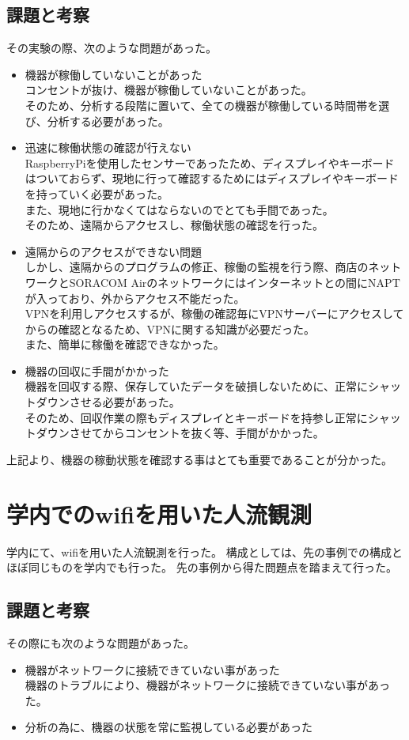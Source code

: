 \subsection{課題と考察}
その実験の際、次のような問題があった。
\begin{itemize}
	\item 機器が稼働していないことがあった\\
		コンセントが抜け、機器が稼働していないことがあった。\\
		そのため、分析する段階に置いて、全ての機器が稼働している時間帯を選び、分析する必要があった。
	\item 迅速に稼働状態の確認が行えない\\
		RaspberryPiを使用したセンサーであったため、ディスプレイやキーボードはついておらず、現地に行って確認するためにはディスプレイやキーボードを持っていく必要があった。\\
		また、現地に行かなくてはならないのでとても手間であった。\\
		そのため、遠隔からアクセスし、稼働状態の確認を行った。
	\item 遠隔からのアクセスができない問題\\
		しかし、遠隔からのプログラムの修正、稼働の監視を行う際、商店のネットワークとSORACOM Airのネットワークにはインターネットとの間にNAPTが入っており、外からアクセス不能だった。\\
		VPNを利用しアクセスするが、稼働の確認毎にVPNサーバーにアクセスしてからの確認となるため、VPNに関する知識が必要だった。\\
		また、簡単に稼働を確認できなかった。
	\item 機器の回収に手間がかかった\\
		機器を回収する際、保存していたデータを破損しないために、正常にシャットダウンさせる必要があった。\\
		そのため、回収作業の際もディスプレイとキーボードを持参し正常にシャットダウンさせてからコンセントを抜く等、手間がかかった。
\end{itemize}
上記より、機器の稼動状態を確認する事はとても重要であることが分かった。

\section{学内でのwifiを用いた人流観測}
学内にて、wifiを用いた人流観測を行った。
構成としては、先の事例での構成とほぼ同じものを学内でも行った。
先の事例から得た問題点を踏まえて行った。

\subsection{課題と考察}
その際にも次のような問題があった。
\begin{itemize}
	\item 機器がネットワークに接続できていない事があった\\
		機器のトラブルにより、機器がネットワークに接続できていない事があった。
	\item 分析の為に、機器の状態を常に監視している必要があった\\
\end{itemize}

